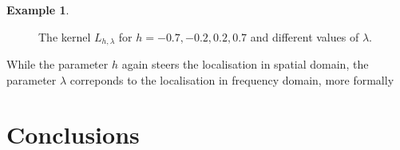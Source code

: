 \documentclass[11pt,a4paper,twoside,bibtotoc]{scrartcl}
\theoremstyle{plain}
\theoremstyle{definition}
\newtheorem{example}[theorem]{Example}
\theoremstyle{remark}
\numberwithin{equation}{section}
\numberwithin{table}{section}
\numberwithin{figure}{section}
\begin{document}
\begin{example}
\begin{figure}[tb]
    \caption{The kernel $L_{h,\lambda}$ for $h = -0.7, -0.2, 0.2, 0.7$ and different values of $\lambda$.}
    \label{Basics:Figure:LKernel}
  \end{figure}
  While the parameter $h$ again steers the localisation in spatial domain, the
  parameter $\lambda$ correponds to the localisation in frequency domain, more formally
\end{example}


\section{Conclusions}




%
%
%

\end{document}
